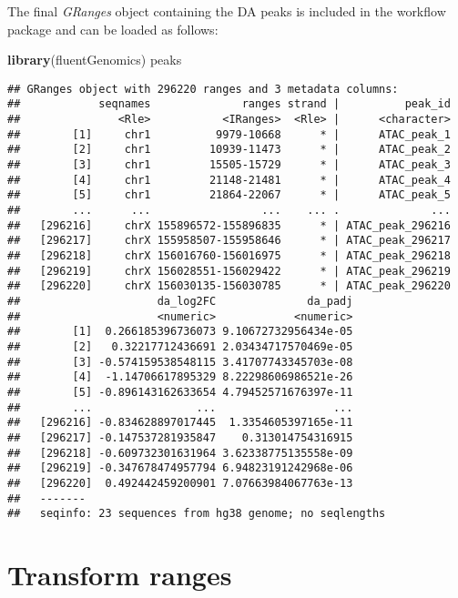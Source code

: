 \documentclass[
]{article}
\newenvironment{Shaded}{}{}
\newcommand{\KeywordTok}[1]{\textcolor[rgb]{0.00,0.44,0.13}{\textbf{#1}}}
\newcommand{\NormalTok}[1]{#1}
\begin{document}
The final \emph{GRanges} object containing the DA peaks is included in the workflow
package and can be loaded as follows:

\begin{Shaded}
\begin{Highlighting}[]
\KeywordTok{library}\NormalTok{(fluentGenomics)}
\NormalTok{peaks}
\end{Highlighting}
\end{Shaded}

\begin{verbatim}
## GRanges object with 296220 ranges and 3 metadata columns:
##            seqnames              ranges strand |          peak_id
##               <Rle>           <IRanges>  <Rle> |      <character>
##        [1]     chr1          9979-10668      * |      ATAC_peak_1
##        [2]     chr1         10939-11473      * |      ATAC_peak_2
##        [3]     chr1         15505-15729      * |      ATAC_peak_3
##        [4]     chr1         21148-21481      * |      ATAC_peak_4
##        [5]     chr1         21864-22067      * |      ATAC_peak_5
##        ...      ...                 ...    ... .              ...
##   [296216]     chrX 155896572-155896835      * | ATAC_peak_296216
##   [296217]     chrX 155958507-155958646      * | ATAC_peak_296217
##   [296218]     chrX 156016760-156016975      * | ATAC_peak_296218
##   [296219]     chrX 156028551-156029422      * | ATAC_peak_296219
##   [296220]     chrX 156030135-156030785      * | ATAC_peak_296220
##                     da_log2FC              da_padj
##                     <numeric>            <numeric>
##        [1]  0.266185396736073 9.10672732956434e-05
##        [2]   0.32217712436691 2.03434717570469e-05
##        [3] -0.574159538548115 3.41707743345703e-08
##        [4]  -1.14706617895329 8.22298606986521e-26
##        [5] -0.896143162633654 4.79452571676397e-11
##        ...                ...                  ...
##   [296216] -0.834628897017445  1.3354605397165e-11
##   [296217] -0.147537281935847    0.313014754316915
##   [296218] -0.609732301631964 3.62338775135558e-09
##   [296219] -0.347678474957794 6.94823191242968e-06
##   [296220]  0.492442459200901 7.07663984067763e-13
##   -------
##   seqinfo: 23 sequences from hg38 genome; no seqlengths
\end{verbatim}

\hypertarget{transform-ranges}{%
\section{Transform ranges}\label{transform-ranges}}
\end{document}
